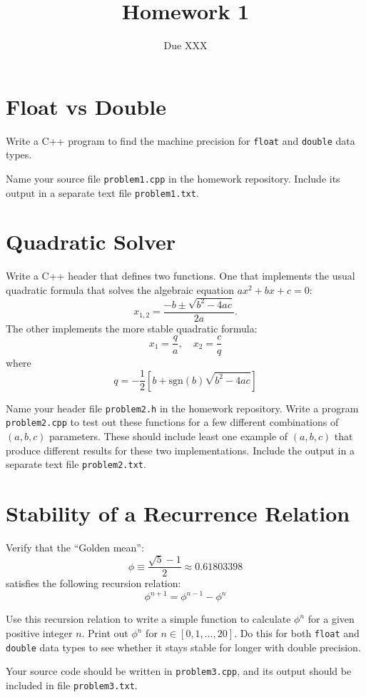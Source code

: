 \documentclass[12pt]{article}
\title{Homework 1}
\date{Due XXX}
\begin{document}
\maketitle

\section{Float vs Double}

Write a C++ program to find the machine precision for \lstinline{float} and \lstinline{double} data types.

Name your source file \texttt{problem1.cpp} in the homework repository. Include its output in a separate text file \texttt{problem1.txt}.

\section{Quadratic Solver}

Write a C++ header that defines two functions. One that implements the usual quadratic formula that solves the algebraic equation $ax^{2} + bx + c = 0$:
\begin{equation}
    x_{1,2} = \frac{-b \pm\sqrt{b^{2} - 4ac}}{2a}.
\end{equation}
The other implements the more stable quadratic formula:
\begin{equation}
    x_{1} = \frac{q}{a},\quad x_{2} = \frac{c}{q}
\end{equation}
where
\begin{equation}
    q = -\frac{1}{2}\left[b + \text{sgn}(b)\sqrt{b^{2} - 4ac}\right]
\end{equation}

Name your header file \texttt{problem2.h} in the homework repository. Write a program \texttt{problem2.cpp} to test out these functions for a few different combinations of $(a, b, c)$ parameters. These should include least one example of $(a, b, c)$ that produce different results for these two implementations. Include the output in a separate text file \texttt{problem2.txt}.

\section{Stability of a Recurrence Relation}

Verify that the ``Golden mean'':
\begin{equation}
    \phi \equiv \frac{\sqrt{5} - 1}{2} \approx 0.61803398
\end{equation}
satisfies the following recursion relation:
\begin{equation}
    \phi^{n+1} = \phi^{n-1} - \phi^{n}
\end{equation}

Use this recursion relation to write a simple function to calculate $\phi^{n}$ for a given positive integer $n$. Print out $\phi^{n}$ for $n\in [0,1,\dots,20]$. Do this for both \lstinline{float} and \lstinline{double} data types to see whether it stays stable for longer with double precision.

Your source code should be written in \texttt{problem3.cpp}, and its output should be included in file \texttt{problem3.txt}.
\end{document}
